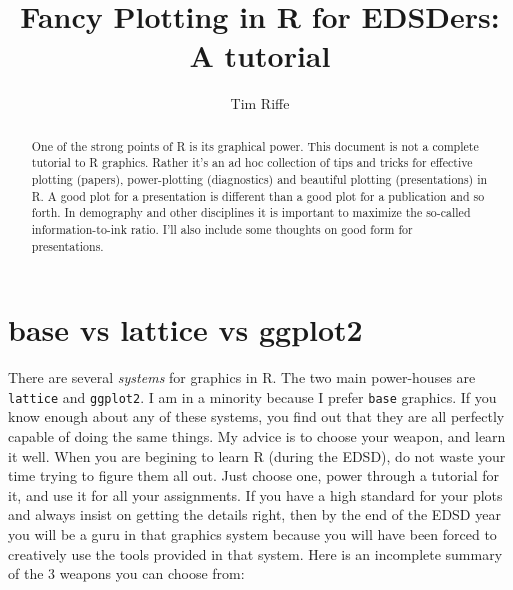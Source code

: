\documentclass[a4paper]{article}
\begin{document}
\title{Fancy Plotting in R for EDSDers: A tutorial}
\author{Tim Riffe}

\maketitle

\begin{abstract}
One of the strong points of R is its graphical power. This document is not a complete tutorial to R graphics. Rather it's an ad hoc collection of tips and tricks for effective plotting (papers), power-plotting (diagnostics) and beautiful plotting (presentations) in R. A good plot for a presentation is different than a good plot for a publication and so forth. In demography and other disciplines it is important to maximize the so-called information-to-ink ratio. I'll also include some thoughts on good form for presentations.
\end{abstract}

\section{base vs lattice vs ggplot2}
There are several \textit{systems} for graphics in R. The two main power-houses are \texttt{lattice} and \texttt{ggplot2}. I am in a minority because I prefer \texttt{base} graphics. If you know enough about any of these systems, you find out that they are all perfectly capable of doing the same things. My advice is to choose your weapon, and learn it well. When you are begining to learn R (during the EDSD), do not waste your time trying to figure them all out. Just choose one,  power through a tutorial for it, and use it for all your assignments. If you have a high standard for your plots and always insist on getting the details right, then by the end of the EDSD year you will be a guru in that graphics system because you will have been forced to creatively use the tools provided in that system. Here is an incomplete summary of the 3 weapons you can choose from:
\end{document}
